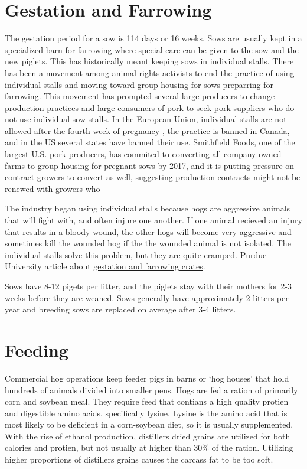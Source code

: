 \documentclass[
]{book}
\begin{document}
\hypertarget{gestation-and-farrowing}{%
\section{Gestation and Farrowing}\label{gestation-and-farrowing}}

The gestation period for a sow is 114 days or 16 weeks. Sows are usually kept in a specialized barn for farrowing where special care can be given to the sow and the new piglets. This has historically meant keeping sows in individual stalls. There has been a movement among animal rights activists to end the practice of using individual stalls and moving toward group housing for sows preparring for farrowing. This movement has prompted several large producers to change production practices and large consumers of pork to seek pork suppliers who do not use individual sow stalls. In the European Union, individual stalls are not allowed after the fourth week of pregnancy \citep{mcglone_future_2013}, the practice is banned in Canada, and in the US several states have banned their use. Smithfield Foods, one of the largest U.S. pork producers, has commited to converting all company owned farms to \href{pdf-Readings/smithfield-2014report.pdf}{group housing for pregnant sows by 2017}, and it is putting pressure on contract growers to convert as well, suggesting production contracts might not be renewed with growers who

The industry began using individual stalls because hogs are aggressive animals that will fight with, and often injure one another. If one animal recieved an injury that results in a bloody wound, the other hogs will become very aggressive and sometimes kill the wounded hog if the the wounded animal is not isolated. The individual stalls solve this problem, but they are quite cramped. Purdue University article about \href{http://www.ansc.purdue.edu/faen/gest\%20crates.html}{gestation and farrowing crates}.

Sows have 8-12 pigets per litter, and the piglets stay with their mothers for 2-3 weeks before they are weaned. Sows generally have approximately 2 litters per year and breeding sows are replaced on average after 3-4 litters.

\hypertarget{feeding}{%
\section{Feeding}\label{feeding}}

Commercial hog operations keep feeder pigs in barns or `hog houses' that hold hundreds of animals divided into smaller pens. Hogs are fed a ration of primarily corn and soybean meal. They require feed that contians a high quality protien and digestible amino acids, specifically lysine. Lysine is the amino acid that is most likely to be deficient in a corn-soybean diet, so it is usually supplemented. With the rise of ethanol production, distillers dried grains are utilized for both calories and protien, but not usually at higher than 30\% of the ration. Utilizing higher proportions of distillers grains causes the carcass fat to be too soft.
\end{document}
